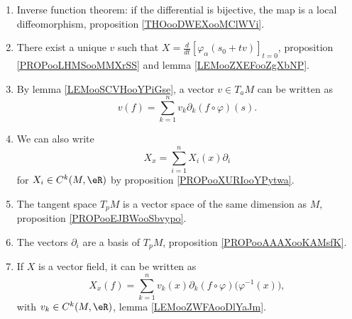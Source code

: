 	\label{THEMEooManifolds}
\begin{enumerate}
	\item
	      Inverse function theorem: if the differential is bijective, the map is a local diffeomorphism, proposition \ref{THOooDWEXooMClWVi}.
	\item
	      There exist a unique \( v\) such that \( X=\frac{d}{dt} \left[ \varphi_{\alpha}(s_0+tv)  \right]_{t=0}\), proposition \ref{PROPooLHMSooMMXrSS} and lemma \ref{LEMooZXEFooZgXbNP}.
	\item
	      By lemma \ref{LEMooSCVHooYPiGse}, a vector \( v\in T_aM\) can be written as
	      \begin{equation}
		      v(f)=\sum_{k=1}^nv_k\partial_k(f\circ \varphi)(s).
	      \end{equation}
	\item
	      We can also write
	      \begin{equation}
		      X_x=\sum_{i=1}^nX_i(x)\partial_i
	      \end{equation}
	      for \( X_i\in C^k(M, \eR)\) by proposition \ref{PROPooXURIooYPytwa}.
	\item
	      The tangent space \( T_pM\) is a vector space of the same dimension as \( M\), proposition \ref{PROPooEJBWooSbvypo}.
	\item
	      The vectors \( \partial_i\) are a basis of \( T_pM\), proposition \ref{PROPooAAAXooKAMsfK}.
	\item
	      If \( X\) is a vector field, it can be written as
	      \begin{equation}
		      X_x(f)=\sum_{k=1}^nv_k(x)\partial_k(f\circ\varphi)\big( \varphi^{-1}(x) \big),
	      \end{equation}
	      with \( v_k\in C^k(M, \eR)\), lemma \ref{LEMooZWFAooDlYaJm}.
\end{enumerate}
